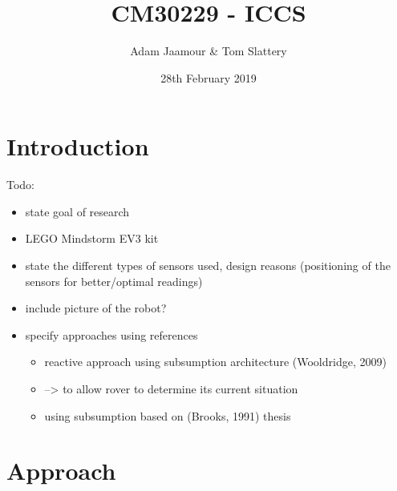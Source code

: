 \documentclass[a4paper,12pt,twocolumn]{article}
\title{CM30229 - ICCS}
\author{Adam Jaamour & Tom Slattery}
\date{28th February 2019}
\begin{document}
\maketitle
\thispagestyle{empty}
\clearpage
\setcounter{page}{1}


\section{Introduction}

Todo:
\begin{itemize}
    \item state goal of research
    \item LEGO Mindstorm EV3 kit
    \item state the different types of sensors used, design reasons (positioning of the sensors for better/optimal readings)
    \item include picture of the robot?
    \item specify approaches using references
    \begin{itemize}
        \item reactive approach using subsumption architecture (Wooldridge, 2009)
        \item --> to allow rover to determine its current situation
        \item using subsumption based on (Brooks, 1991) thesis
    \end{itemize}
\end{itemize}


\section{Approach}
\end{document}
